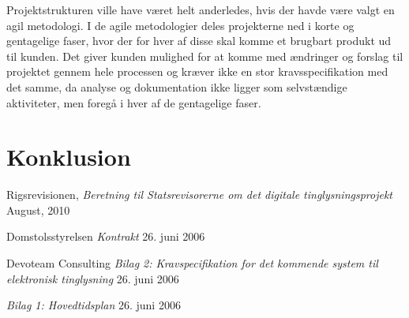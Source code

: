 \documentclass[10pt,a4paper,danish]{article}
\begin{document}
Projektstrukturen ville have været helt anderledes, hvis der havde være valgt en agil metodologi.
I de agile metodologier deles projekterne ned i korte og gentagelige faser, hvor der for hver af disse skal komme et brugbart produkt ud til kunden.
Det giver kunden mulighed for at komme med ændringer og forslag til projektet gennem hele processen og kræver ikke
en stor kravsspecifikation med det samme, da analyse og dokumentation ikke ligger som selvstændige aktiviteter, men
foregå i hver af de gentagelige faser.


\section{Konklusion}


\begin{thebibliography}{9}

  Rigsrevisionen,
  \emph{Beretning til Statsrevisorerne om det digitale
  tinglysningsprojekt}
  August, 2010

Domstolsstyrelsen
  \emph{Kontrakt}
  26. juni 2006

  Devoteam Consulting
  \emph{Bilag 2: Kravspecifikation for det kommende
  system til elektronisk tinglysning}
  26. juni 2006

  \emph{Bilag 1: Hovedtidsplan}
  26. juni 2006

\end{thebibliography}
\end{document}
